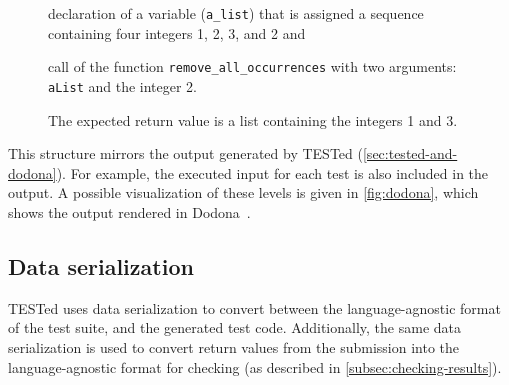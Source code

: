 \documentclass[../main]{subfiles}
\begin{document}
\begin{figure}
{        \begin{enumerate*}[label=\emph{\roman*})]
            \item declaration of a variable (\texttt{a\_list}) that is assigned a sequence containing four integers 1, 2, 3, and 2 and
            \item call of the function \texttt{remove\_all\_occurrences} with two arguments: \texttt{aList} and the integer 2.
        \end{enumerate*}
        The expected return value is a list containing the integers 1 and 3.
        \label{lst:expanded-json-fragment}
    }
\end{figure}

This structure mirrors the output generated by TESTed (\cref{sec:tested-and-dodona}).
For example, the executed input for each test is also included in the output.
A possible visualization of these levels is given in \cref{fig:dodona}, which shows the output rendered in Dodona~\autocite{vanpetegemDodonaLearnCode2023}.

\subsection{Data serialization}\label{subsec:data-serialization}

TESTed uses data serialization to convert between the language-agnostic format of the test suite, and the generated test code.
Additionally, the same data serialization is used to convert return values from the submission into the language-agnostic format for checking (as described in \cref{subsec:checking-results}).
\end{document}
